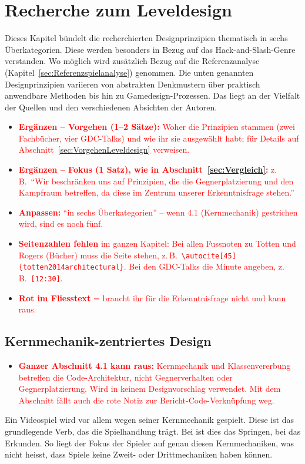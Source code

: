 \documentclass[../Main.tex]{subfiles}
\begin{document}
\section{Recherche zum Leveldesign} \label{sec:Leveldesign}
Dieses Kapitel bündelt die recherchierten Designprinzipien thematisch in sechs Überkategorien. Diese werden besonders in Bezug auf das Hack-and-Slash-Genre verstanden. Wo möglich wird zusätzlich Bezug auf die Referenzanalyse (Kapitel~\ref{sec:Referenzspielanalyse}) genommen. Die unten genannten Designprinzipien variieren von abstrakten Denkmustern über praktisch anwendbare Methoden bis hin zu Gamedesign-Prozessen. Das liegt an der Vielfalt der Quellen und den verschiedenen Absichten der Autoren.
\begin{itemize}[leftmargin=1.5cm]
    \item \textcolor{red}{\textbf{Ergänzen -- Vorgehen (1--2 Sätze):} Woher die Prinzipien stammen (zwei Fachbücher, vier GDC-Talks) und wie ihr sie ausgewählt habt; für Details auf Abschnitt~\ref{sec:VorgehenLeveldesign} verweisen.}
    \item \textcolor{red}{\textbf{Ergänzen -- Fokus (1 Satz), wie in Abschnitt~\ref{sec:Vergleich}:} z.\,B.\ \enquote{Wir beschränken uns auf Prinzipien, die die Gegnerplatzierung und den Kampfraum betreffen, da diese im Zentrum unserer Erkenntnisfrage stehen.}}
    \item \textcolor{red}{\textbf{Anpassen:} \enquote{in sechs Überkategorien} -- wenn 4.1 (Kernmechanik) gestrichen wird, sind es noch fünf.}
    \item \textcolor{red}{\textbf{Seitenzahlen fehlen} im ganzen Kapitel: Bei allen Fussnoten zu Totten und Rogers (Bücher) muss die Seite stehen, z.\,B.\ \texttt{\textbackslash autocite[45]\{totten2014architectural\}}. Bei den GDC-Talks die Minute angeben, z.\,B.\ \texttt{[12:30]}.}
    \item \textcolor{red}{\textbf{Rot im Fliesstext} = braucht ihr für die Erkenntnisfrage nicht und kann raus.}
\end{itemize}

\subsection{Kernmechanik-zentriertes Design} \label{sec:Kernmechanik}

\begin{itemize}[leftmargin=1.5cm]
    \item \textcolor{red}{\textbf{Ganzer Abschnitt 4.1 kann raus:} Kernmechanik und Klassenvererbung betreffen die Code-Architektur, nicht Gegnerverhalten oder Gegnerplatzierung. Wird in keinem Designvorschlag verwendet. Mit dem Abschnitt fällt auch die rote Notiz zur Bericht-Code-Verknüpfung weg.}
\end{itemize}
\begingroup\color{red}Ein Videospiel wird vor allem wegen seiner Kernmechanik gespielt. Diese ist das grundlegende Verb, das die Spielhandlung trägt.\autocite{totten2014architectural} Bei  ist dies das Springen, bei  das Erkunden. So liegt der Fokus der Spieler auf genau diesen Kernmechaniken, was nicht heisst, dass Spiele keine Zweit- oder Drittmechaniken haben können.
\end{document}
